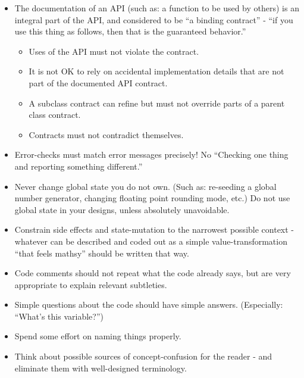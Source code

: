 \documentclass[11pt]{article}
\providecommand{\tightlist}{%
      \setlength{\itemsep}{0pt}\setlength{\parskip}{0pt}}
\begin{document}
\begin{itemize}
\item
  The documentation of an API (such as: a function to be used by others)
  is an integral part of the API, and considered to be ``a binding
  contract'' - ``if you use this thing as follows, then that is the
  guaranteed behavior.''

  \begin{itemize}
  \tightlist
  \item
    Uses of the API must not violate the contract.
  \item
    It is not OK to rely on accidental implementation details that are
    not part of the documented API contract.
  \item
    A subclass contract can refine but must not override parts of a
    parent class contract.
  \item
    Contracts must not contradict themselves.
  \end{itemize}
\item
  Error-checks must match error messages precisely! No ``Checking one
  thing and reporting something different.''
\item
  Never change global state you do not own. (Such as: re-seeding a
  global number generator, changing floating point rounding mode, etc.)
  Do not use global state in your designs, unless absolutely
  unavoidable.
\item
  Constrain side effects and state-mutation to the narrowest possible
  context - whatever can be described and coded out as a simple
  value-transformation ``that feels mathsy'' should be written that way.
\item
  Code comments should not repeat what the code already says, but are
  very appropriate to explain relevant subtleties.
\item
  Simple questions about the code should have simple answers.
  (Especially: ``What's this variable?'')
\item
  Spend some effort on naming things properly.
\item
  Think about possible sources of concept-confusion for the reader - and
  eliminate them with well-designed terminology.


\end{itemize}
\end{document}
